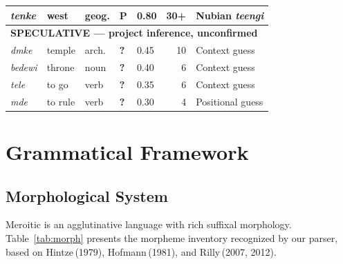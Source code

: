 \documentclass[11pt,a4paper]{article}
\begin{document}
\begin{longtable}{lllllrl}
    \textit{tenke} & west & geog. & P & 0.80 & 30+ & Nubian \textit{teengi} \\
  \midrule
  \multicolumn{7}{l}{\textbf{SPECULATIVE --- project inference, unconfirmed}} \\
  \midrule
    \textit{dmke} & temple & arch. & \textbf{?} & 0.45 & 10 & Context guess \\
    \textit{bedewi} & throne & noun & \textbf{?} & 0.40 & 6 & Context guess \\
    \textit{tele} & to go & verb & \textbf{?} & 0.35 & 6 & Context guess \\
    \textit{mde} & to rule & verb & \textbf{?} & 0.30 & 4 & Positional guess \\
  \bottomrule
\end{longtable}


\section{Grammatical Framework}

\subsection{Morphological System}

Meroitic is an agglutinative language with rich suffixal morphology.
Table~\ref{tab:morph} presents the morpheme inventory recognized by our
parser, based on Hintze\,(1979), Hofmann\,(1981), and Rilly\,(2007, 2012).
\end{document}
